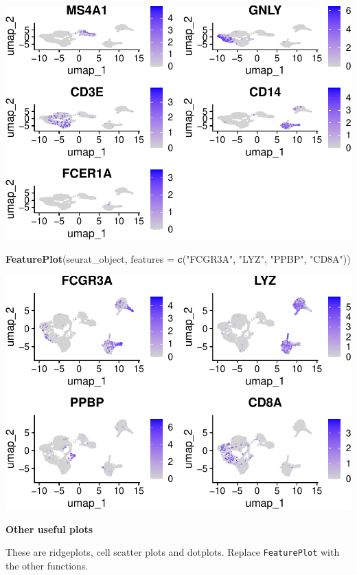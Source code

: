 \documentclass[
]{book}
\newenvironment{Shaded}{\begin{snugshade}}{\end{snugshade}}
\newcommand{\AttributeTok}[1]{\textcolor[rgb]{0.13,0.29,0.53}{#1}}
\newcommand{\FunctionTok}[1]{\textcolor[rgb]{0.13,0.29,0.53}{\textbf{#1}}}
\newcommand{\NormalTok}[1]{#1}
\newcommand{\StringTok}[1]{\textcolor[rgb]{0.31,0.60,0.02}{#1}}
\begin{document}
\includegraphics{scRNAseqInR_ABACBS_2024_Doco_files/figure-latex/markerplots-1.pdf}

\begin{Shaded}
\begin{Highlighting}[]
\FunctionTok{FeaturePlot}\NormalTok{(seurat\_object, }\AttributeTok{features =} \FunctionTok{c}\NormalTok{(}\StringTok{"FCGR3A"}\NormalTok{, }\StringTok{"LYZ"}\NormalTok{, }\StringTok{"PPBP"}\NormalTok{, }\StringTok{"CD8A"}\NormalTok{))}
\end{Highlighting}
\end{Shaded}

\includegraphics{scRNAseqInR_ABACBS_2024_Doco_files/figure-latex/markerplots-2.pdf}

\textbf{Other useful plots}

These are ridgeplots, cell scatter plots and dotplots. Replace \texttt{FeaturePlot} with the other functions.
\end{document}

